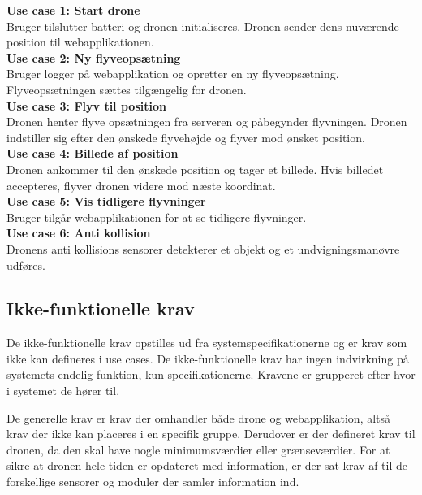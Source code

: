 \textbf{Use case 1: Start drone} \\
Bruger tilslutter batteri og dronen initialiseres. Dronen sender dens nuværende position til webapplikationen.\\

\textbf{Use case 2: Ny flyveopsætning} \\
Bruger logger på webapplikation og opretter en ny flyveopsætning. Flyveopsætningen sættes tilgængelig for dronen.\\

\textbf{Use case 3: Flyv til position}\\
Dronen henter flyve opsætningen fra serveren og påbegynder flyvningen. Dronen indstiller sig efter den ønskede flyvehøjde og flyver mod ønsket position. \\

\textbf{Use case 4: Billede af position} \\
Dronen ankommer til den ønskede position og tager et billede. Hvis billedet accepteres, flyver dronen videre mod næste koordinat. \\

\textbf{Use case 5: Vis tidligere flyvninger} \\
Bruger tilgår webapplikationen for at se tidligere flyvninger.\\

\textbf{Use case 6: Anti kollision} \\
Dronens anti kollisions sensorer detekterer et objekt og et undvigningsmanøvre udføres. \\

\newpage
\subsection{Ikke-funktionelle krav}


De ikke-funktionelle krav opstilles ud fra systemspecifikationerne og er krav som ikke kan defineres i use cases. De ikke-funktionelle krav har ingen indvirkning på systemets endelig funktion, kun specifikationerne.
Kravene er grupperet efter hvor i systemet de hører til. 

De generelle krav er krav der omhandler både drone og webapplikation, altså krav der ikke kan placeres i en specifik gruppe.
Derudover er der defineret krav til dronen, da den skal have nogle minimumsværdier eller grænseværdier.
For at sikre at dronen hele tiden er opdateret med information, er der sat krav af til de forskellige sensorer og moduler der samler information ind.


